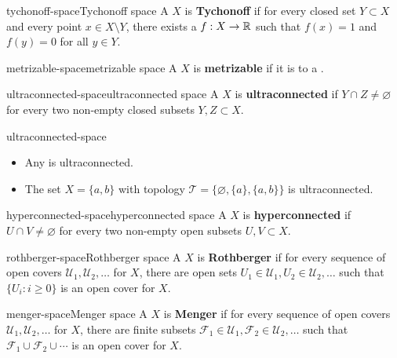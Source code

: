 \begin{topic}{tychonoff-space}{Tychonoff space}
    A  $X$ is \textbf{Tychonoff} if for every closed set $Y \subset X$ and every point $x \in X \setminus Y$, there exists a  $f : X \to \mathbb{R}$ such that $f(x) = 1$ and $f(y) = 0$ for all $y \in Y$.
\end{topic}

\begin{topic}{metrizable-space}{metrizable space}
    A  $X$ is \textbf{metrizable} if it is  to a .
\end{topic}

\begin{topic}{ultraconnected-space}{ultraconnected space}
    A  $X$ is \textbf{ultraconnected} if $Y \cap Z \ne \varnothing$ for every two non-empty closed subsets $Y, Z \subset X$.
\end{topic}

\begin{example}{ultraconnected-space}
    \begin{itemize}
        \item Any  is ultraconnected.
        \item The set $X = \{ a, b \}$ with topology $\mathcal{T} = \{ \varnothing, \{ a \}, \{ a, b \} \}$ is ultraconnected.
    \end{itemize}
\end{example}

\begin{topic}{hyperconnected-space}{hyperconnected space}
    A  $X$ is \textbf{hyperconnected} if $U \cap V \ne \varnothing$ for every two non-empty open subsets $U, V \subset X$.
\end{topic}

\begin{topic}{rothberger-space}{Rothberger space}
    A  $X$ is \textbf{Rothberger} if for every sequence of open covers $\mathcal{U}_1, \mathcal{U}_2, \ldots$ for $X$, there are open sets $U_1 \in \mathcal{U}_1, U_2 \in \mathcal{U}_2, \ldots$ such that $\{ U_i : i \ge 0 \}$ is an open cover for $X$.
\end{topic}

\begin{topic}{menger-space}{Menger space}
    A  $X$ is \textbf{Menger} if for every sequence of open covers $\mathcal{U}_1, \mathcal{U}_2, \ldots$ for $X$, there are finite subsets $\mathcal{F}_1 \in \mathcal{U}_1, \mathcal{F}_2 \in \mathcal{U}_2, \ldots$ such that $\mathcal{F}_1 \cup \mathcal{F}_2 \cup \cdots$ is an open cover for $X$.
\end{topic}

